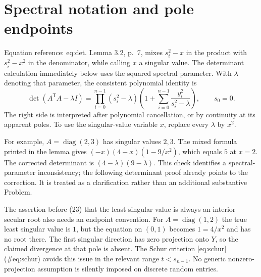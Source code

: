 \documentclass[10pt]{article}
\begin{document}
\section*{Spectral notation and pole endpoints}
Equation reference: eq:det. Lemma 3.2, p. 7, mixes \(s_i^2-x\) in the product with \(s_i^2-x^2\) in the denominator, while calling \(x\) a singular value. The determinant calculation immediately below uses the squared spectral parameter. With \(\lambda\) denoting that parameter, the consistent polynomial identity is \[\det(A^{\mathsf T}A-\lambda I)
 =\prod_{i=0}^{n-1}(s_i^2-\lambda)
   \left(1+\sum_{i=0}^{n-1}\frac{y_i^2}{s_i^2-\lambda}\right),
 \qquad s_0=0.
 \] The right side is interpreted after polynomial cancellation, or by continuity at its apparent poles. To use the singular-value variable \(x\), replace every \(\lambda\) by \(x^2\).\par
For example, \(A=\operatorname{diag}(2,3)\) has singular values \(2,3\). The mixed formula printed in the lemma gives \((-x)(4-x)(1-9/x^2)\), which equals \(5\) at \(x=2\). The corrected determinant is \((4-\lambda)(9-\lambda)\). This check identifies a spectral-parameter inconsistency; the following determinant proof already points to the correction. It is treated as a clarification rather than an additional substantive Problem.\par
The assertion before (23) that the least singular value is always an interior secular root also needs an endpoint convention. For \(A=\operatorname{diag}(1,2)\) the true least singular value is \(1\), but the equation on \((0,1)\) becomes \(1=4/x^2\) and has no root there. The first singular direction has zero projection onto \(Y\), so the claimed divergence at that pole is absent. The Schur criterion [eq:schur] (\#eq:schur) avoids this issue in the relevant range \(t<s_{n-1}\). No generic nonzero-projection assumption is silently imposed on discrete random entries.\par
\end{document}

